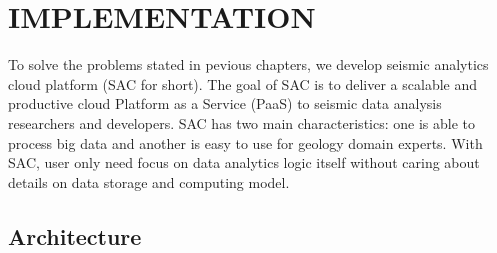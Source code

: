 %
%
%

\chapter{\uppercase{Implementation}}
To solve the problems stated in pevious chapters, we develop seismic analytics cloud platform (SAC for short). The goal of SAC is to deliver a scalable and productive cloud Platform as a Service (PaaS) to seismic data analysis researchers and developers. SAC has two main characteristics: one is able to process big data and another is easy to use for geology domain experts. With SAC, user only need focus on data analytics logic itself without caring about details on data storage and computing model. 


\section{Architecture}

